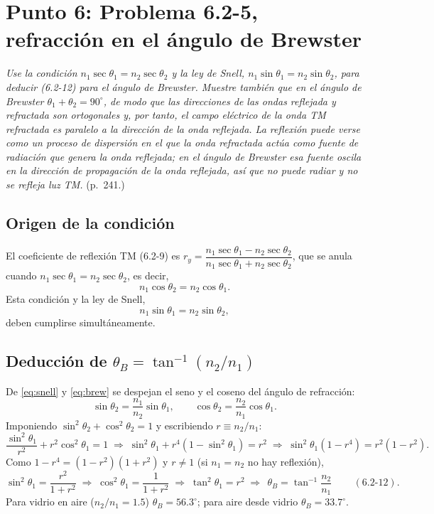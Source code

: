 \documentclass{article}
\begin{document}
\section{Punto 6: Problema 6.2-5, refracción en el ángulo de Brewster}

\emph{Use la condición $n_1\sec\theta_1=n_2\sec\theta_2$ y la ley de Snell,
$n_1\sin\theta_1=n_2\sin\theta_2$, para deducir (6.2-12) para el ángulo de Brewster. Muestre
también que en el ángulo de Brewster $\theta_1+\theta_2=90^\circ$, de modo que las direcciones
de las ondas reflejada y refractada son ortogonales y, por tanto, el campo eléctrico de la onda TM
refractada es paralelo a la dirección de la onda reflejada. La reflexión puede verse como un
proceso de dispersión en el que la onda refractada actúa como fuente de radiación que genera la
onda reflejada; en el ángulo de Brewster esa fuente oscila en la dirección de propagación de la
onda reflejada, así que no puede radiar y no se refleja luz TM.} (p.~241.)

\subsection*{Origen de la condición}

El coeficiente de reflexión TM (6.2-9) es
$r_y=\dfrac{n_1\sec\theta_1-n_2\sec\theta_2}{n_1\sec\theta_1+n_2\sec\theta_2}$, que se anula
cuando $n_1\sec\theta_1=n_2\sec\theta_2$, es decir,
\begin{equation}
n_1\cos\theta_2=n_2\cos\theta_1 .
\label{eq:brew}
\end{equation}
Esta condición y la ley de Snell,
\begin{equation}
n_1\sin\theta_1=n_2\sin\theta_2 ,
\label{eq:snell}
\end{equation}
deben cumplirse simultáneamente.

\subsection*{Deducción de $\theta_B=\tan^{-1}(n_2/n_1)$}

De \eqref{eq:snell} y \eqref{eq:brew} se despejan el seno y el coseno del ángulo de refracción:
\[
\sin\theta_2=\frac{n_1}{n_2}\sin\theta_1,\qquad \cos\theta_2=\frac{n_2}{n_1}\cos\theta_1 .
\]
Imponiendo $\sin^2\theta_2+\cos^2\theta_2=1$ y escribiendo $r\equiv n_2/n_1$:
\[
\frac{\sin^2\theta_1}{r^2}+r^2\cos^2\theta_1=1
\;\Longrightarrow\;
\sin^2\theta_1+r^4\left(1-\sin^2\theta_1\right)=r^2
\;\Longrightarrow\;
\sin^2\theta_1\left(1-r^4\right)=r^2\left(1-r^2\right).
\]
Como $1-r^4=(1-r^2)(1+r^2)$ y $r\neq1$ (si $n_1=n_2$ no hay reflexión),
\[
\sin^2\theta_1=\frac{r^2}{1+r^2}
\;\Longrightarrow\;
\cos^2\theta_1=\frac{1}{1+r^2}
\;\Longrightarrow\;
\tan^2\theta_1=r^2
\;\Longrightarrow\;
\boxed{\,\theta_B=\tan^{-1}\!\frac{n_2}{n_1}\,}\qquad(6.2\text{-}12).
\]
Para vidrio en aire ($n_2/n_1=1.5$) $\theta_B=56.3^\circ$; para aire desde vidrio
$\theta_B=33.7^\circ$.
\end{document}
